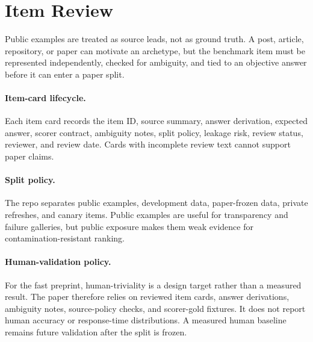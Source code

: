 \section{Item Review}

Public examples are treated as source leads, not as ground truth. A post,
article, repository, or paper can motivate an archetype, but the benchmark item
must be represented independently, checked for ambiguity, and tied to an
objective answer before it can enter a paper split.

\paragraph{Item-card lifecycle.}
Each item card records the item ID, source summary, answer derivation, expected
answer, scorer contract, ambiguity notes, split policy, leakage risk, review
status, reviewer, and review date. Cards with incomplete review text cannot
support paper claims.

\paragraph{Split policy.}
The repo separates public examples, development data, paper-frozen data,
private refreshes, and canary items. Public examples are useful for
transparency and failure galleries, but public exposure makes them weak
evidence for contamination-resistant ranking.

\paragraph{Human-validation policy.}
For the fast preprint, human-triviality is a design target rather than a
measured result. The paper therefore relies on reviewed item cards, answer
derivations, ambiguity notes, source-policy checks, and scorer-gold fixtures.
It does not report human accuracy or response-time distributions. A measured
human baseline remains future validation after the split is frozen.
